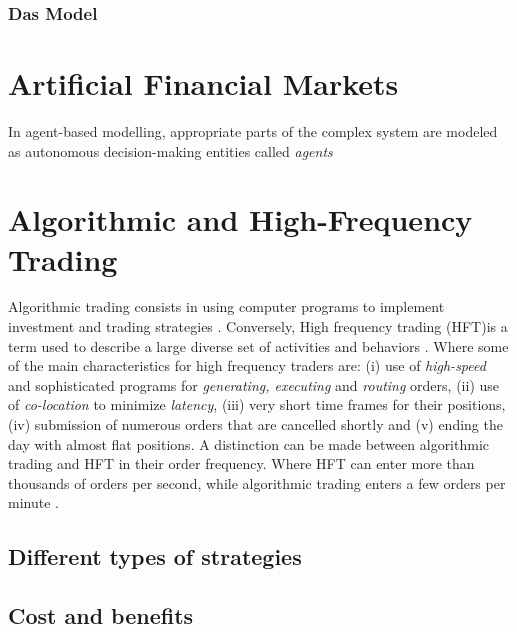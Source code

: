 \documentclass{kththesis}
\theoremstyle{definition}
\begin{document}
\subsubsection*{Das Model}


\section{Artificial Financial Markets}
In agent-based modelling, appropriate parts of the complex system are modeled as autonomous decision-making entities called \textit{agents} \parencite{darley2007nasdaq}


\section{Algorithmic and High-Frequency Trading}
Algorithmic trading consists in using computer programs to implement investment and trading strategies \parencite{abergel2012market}. Conversely, High frequency trading (HFT)is a term used to describe a large diverse set of activities and behaviors \parencite{o2015high}. Where some of the main characteristics for high frequency traders are: (i) use of \textit{high-speed} and sophisticated programs for \textit{generating, executing} and \textit{routing} orders, (ii) use of \textit{co-location} to minimize \textit{latency}, (iii) very short time frames for their positions, (iv) submission of numerous orders that are cancelled shortly and (v) ending the day with almost flat positions. 
\newline
\newline
A distinction can be made between algorithmic trading and HFT in their order frequency. Where HFT can enter more than thousands of orders per second, while algorithmic trading enters a few orders per minute \parencite{abergel2012market}.

\subsection{Different types of strategies}

\subsection{Cost and benefits}
\end{document}
